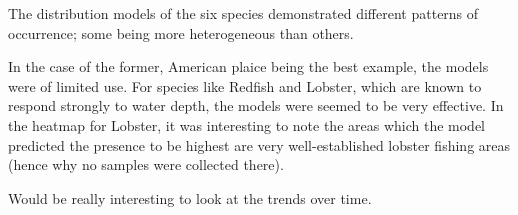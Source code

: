 The distribution models of the six species demonstrated different patterns of occurrence; some being more heterogeneous than others.


In the case of the former, American plaice being the best example, the models were of limited use.
For species like Redfish and Lobster, which are known to respond strongly to water depth, the models were seemed to be very effective.
In the heatmap for Lobster, it was interesting to note the areas which the model predicted the presence to be highest are
very well-established lobster fishing areas (hence why no samples were collected there).






Would be really interesting to look at the trends over time.